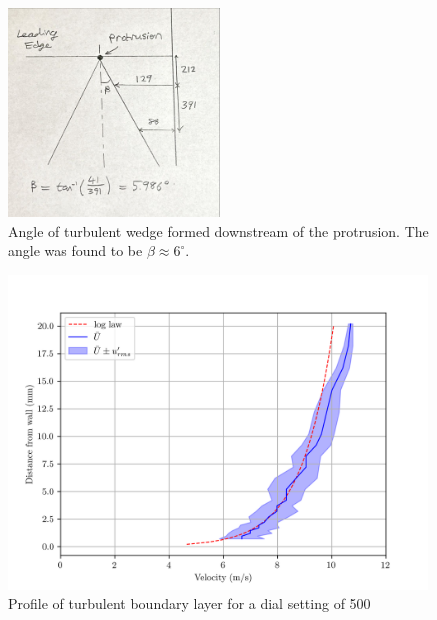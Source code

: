 \documentclass{article}
\begin{document}

\begin{figure}[H]
    \centering
    \includegraphics[width=0.5\textwidth]{turbulent_wedge.jpg}
    \caption{Angle of turbulent wedge formed downstream of the protrusion. The angle was found to be $\beta \approx 6^\circ$.}
    \label{fig:turbulent_wedge}
\end{figure}


\begin{figure}[H]
    \centering
    \includegraphics[width=0.99\textwidth]{turbulent_profile.png}
    \caption{Profile of turbulent boundary layer for a dial setting of 500}
    \label{fig:turbulent_profile}
\end{figure}
\end{document}
